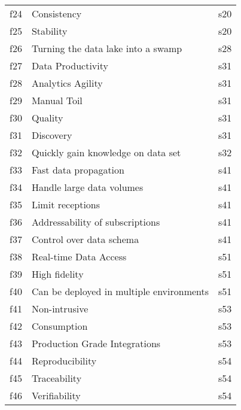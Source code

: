 \begin{tabular}{|c|p{}|p{}|}
f24 & Consistency & \cellcolor{emerald_shape_1} {s20}\\
f25 & Stability & \cellcolor{emerald_shape_1} {s20}\\
f26 & Turning the data lake into a swamp & \cellcolor{emerald_shape_1} {s28}\\
f27 & Data Productivity & \cellcolor{emerald_shape_1} {s31}\\
f28 & Analytics Agility & \cellcolor{emerald_shape_1} {s31}\\
f29 & Manual Toil & \cellcolor{emerald_shape_1} {s31}\\
f30 & Quality & \cellcolor{emerald_shape_1} {s31}\\
f31 & Discovery & \cellcolor{emerald_shape_1} {s31}\\
f32 & Quickly gain knowledge on data set & \cellcolor{emerald_shape_1} {s32}\\
f33 & Fast data propagation & \cellcolor{emerald_shape_1} {s41}\\
f34 & Handle large data volumes & \cellcolor{emerald_shape_1} {s41}\\
f35 & Limit receptions & \cellcolor{emerald_shape_1} {s41}\\
f36 & Addressability of subscriptions & \cellcolor{emerald_shape_1} {s41}\\
f37 & Control over data schema & \cellcolor{emerald_shape_1} {s41}\\
f38 & Real-time Data Access & \cellcolor{emerald_shape_1} {s51}\\
f39 & High fidelity & \cellcolor{emerald_shape_1} {s51}\\
f40 & Can be deployed in multiple environments & \cellcolor{emerald_shape_1} {s51}\\
f41 & Non-intrusive & \cellcolor{emerald_shape_1} {s53}\\
f42 & Consumption & \cellcolor{emerald_shape_1} {s53}\\
f43 & Production Grade Integrations & \cellcolor{emerald_shape_1} {s53}\\
f44 & Reproducibility & \cellcolor{emerald_shape_1} {s54}\\
f45 & Traceability & \cellcolor{emerald_shape_1} {s54}\\
f46 & Verifiability & \cellcolor{emerald_shape_1} {s54}\\
\hline
\end{tabular}
